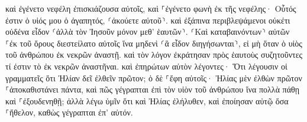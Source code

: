 \documentclass{openreader}
\begin{document}
καὶ ἐγένετο νεφέλη ἐπισκιάζουσα αὐτοῖς, καὶ ⸀ἐγένετο φωνὴ ἐκ τῆς νεφέλης· Οὗτός ἐστιν ὁ υἱός μου ὁ ἀγαπητός, ⸂ἀκούετε αὐτοῦ⸃. 
καὶ ἐξάπινα περιβλεψάμενοι οὐκέτι οὐδένα εἶδον ⸂ἀλλὰ τὸν Ἰησοῦν μόνον μεθ’ ἑαυτῶν⸃. 
⸂Καὶ καταβαινόντων⸃ αὐτῶν ⸀ἐκ τοῦ ὄρους διεστείλατο αὐτοῖς ἵνα μηδενὶ ⸂ἃ εἶδον διηγήσωνται⸃, εἰ μὴ ὅταν ὁ υἱὸς τοῦ ἀνθρώπου ἐκ νεκρῶν ἀναστῇ. 
καὶ τὸν λόγον ἐκράτησαν πρὸς ἑαυτοὺς συζητοῦντες τί ἐστιν τὸ ἐκ νεκρῶν ἀναστῆναι. 
καὶ ἐπηρώτων αὐτὸν λέγοντες· Ὅτι λέγουσιν οἱ γραμματεῖς ὅτι Ἠλίαν δεῖ ἐλθεῖν πρῶτον; 
ὁ δὲ ⸀ἔφη αὐτοῖς· Ἠλίας μὲν ἐλθὼν πρῶτον ⸀ἀποκαθιστάνει πάντα, καὶ πῶς γέγραπται ἐπὶ τὸν υἱὸν τοῦ ἀνθρώπου ἵνα πολλὰ πάθῃ καὶ ⸀ἐξουδενηθῇ; 
ἀλλὰ λέγω ὑμῖν ὅτι καὶ Ἠλίας ἐλήλυθεν, καὶ ἐποίησαν αὐτῷ ὅσα ⸀ἤθελον, καθὼς γέγραπται ἐπ’ αὐτόν. 
\end{document}
